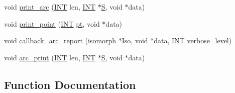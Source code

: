 \begin{DoxyCompactItemize}
\item 
void \mbox{\hyperlink{arc__generator_8_c_a2d0267ec166d32b91a35af1d1e66427f}{print\+\_\+arc}} (\mbox{\hyperlink{galois_8h_a09fddde158a3a20bd2dcadb609de11dc}{I\+NT}} len, \mbox{\hyperlink{galois_8h_a09fddde158a3a20bd2dcadb609de11dc}{I\+NT}} $\ast$\mbox{\hyperlink{simeon_8_c_adab47f8243f1b5a2c31df2535d6b37d0}{S}}, void $\ast$data)
\item 
void \mbox{\hyperlink{arc__generator_8_c_a2bde441010b814b154aea558c1272280}{print\+\_\+point}} (\mbox{\hyperlink{galois_8h_a09fddde158a3a20bd2dcadb609de11dc}{I\+NT}} \mbox{\hyperlink{clique__finder_8_c_aec1f1a2b30fdca8844c2932384483145}{pt}}, void $\ast$data)
\item 
void \mbox{\hyperlink{arc__generator_8_c_abf642e61d2743877394bdef7b97d031c}{callback\+\_\+arc\+\_\+report}} (\mbox{\hyperlink{classisomorph}{isomorph}} $\ast$Iso, void $\ast$data, \mbox{\hyperlink{galois_8h_a09fddde158a3a20bd2dcadb609de11dc}{I\+NT}} \mbox{\hyperlink{simeon_8_c_a818073fbcc2f439e7c56952f67386122}{verbose\+\_\+level}})
\item 
void \mbox{\hyperlink{arc__generator_8_c_a8e0ca684a5ab16e4056254023c36455c}{arc\+\_\+print}} (\mbox{\hyperlink{galois_8h_a09fddde158a3a20bd2dcadb609de11dc}{I\+NT}} len, \mbox{\hyperlink{galois_8h_a09fddde158a3a20bd2dcadb609de11dc}{I\+NT}} $\ast$\mbox{\hyperlink{simeon_8_c_adab47f8243f1b5a2c31df2535d6b37d0}{S}}, void $\ast$data)
\end{DoxyCompactItemize}


\subsection{Function Documentation}
\mbox{\label{arc__generator_8_c_a9c1a41c4103eab0ee110634287fa5670}} 
